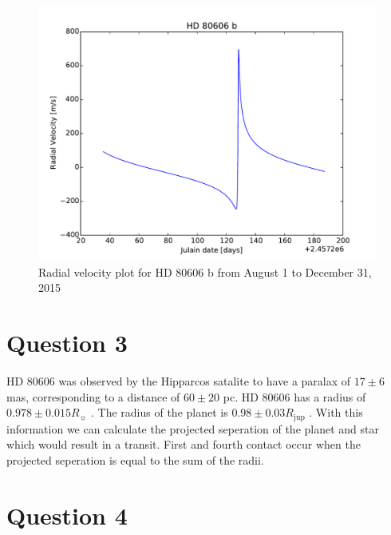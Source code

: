 \documentclass[preprint]{aastex}
\begin{document}
\begin{figure}[h]
\begin{center}
    \includegraphics[width=\textwidth]{Q2.pdf}
    \caption{Radial velocity plot for HD 80606 b from August 1 to December 31, 2015}
    \label{fig:RV}
\end{center}
\end{figure}

\section{Question 3}

HD 80606 was observed by the Hipparcos satalite to have a paralax of $17\pm6$ mas, corresponding to a distance of $60\pm20$ pc. HD 80606 has a radius of $0.978\pm0.015 R_\sun$ \citep{orbparam}. The radius of the planet is $0.98\pm0.03 R_\mathrm{jup}$ \citep{orbparam}. With this information we can calculate the projected seperation of the planet and star which would result in a transit. First and fourth contact occur when the projected seperation is equal to the sum of the radii. 

\section{Question 4}




\end{document}
